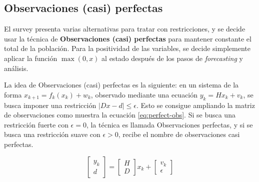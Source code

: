 \subsection{Observaciones (casi) perfectas} \label{casiperfect}

El survey \cite{Simon2010} presenta varias alternativas para tratar con restricciones, y se decide usar la técnica de \textbf{Observaciones (casi) perfectas} para mantener constante el total de la población. Para la positividad de las variables, se decide simplemente aplicar la función \(\max(0, x)\) al estado después de los pasos de \textit{forecasting} y análisis.

La idea de Observaciones (casi) perfectas es la siguiente: en un sistema de la forma \(x_{k+1} = f_k(x_k) + w_k\), observado mediante una ecuación \(y_k = Hx_k + v_k \), se busca imponer una restricción \(|Dx - d| \leq \epsilon\). Esto se consigue ampliando la matriz de observaciones como muestra la ecuación \ref{eq:perfect-obs}. Si se busca una restricción fuerte con \(\epsilon = 0\), la técnica es llamada Observaciones perfectas, y si se busca una restricción suave con \(\epsilon > 0\), recibe el nombre de observaciones casi perfectas.


\begin{equation}\label{eq:perfect-obs}
\begin{bmatrix}
y_k \\
d 
\end{bmatrix} = 
\begin{bmatrix}
H \\
D
\end{bmatrix} x_k
+
\begin{bmatrix}
v_k \\
\epsilon  
\end{bmatrix}
\end{equation}










